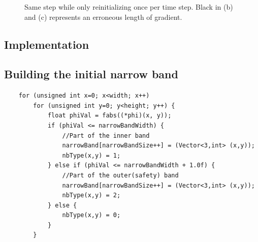 \begin{figure}[h]
  \centering
  \caption{Same step while only reinitializing once per time step. Black in (b) and (c) represents an erroneous length of gradient.}
  \label{fig:narrowBand}
\end{figure}




\subsection{Implementation}


\subsection{Building the initial narrow band}
\begin{lstlisting}
    for (unsigned int x=0; x<width; x++)
        for (unsigned int y=0; y<height; y++) {
            float phiVal = fabs((*phi)(x, y));
            if (phiVal <= narrowBandWidth) {
                //Part of the inner band
                narrowBand[narrowBandSize++] = (Vector<3,int> (x,y));
                nbType(x,y) = 1;
            } else if (phiVal <= narrowBandWidth + 1.0f) {
                //Part of the outer(safety) band
                narrowBand[narrowBandSize++] = (Vector<3,int> (x,y));
                nbType(x,y) = 2;
            } else {
                nbType(x,y) = 0;
            }
        }
\end{lstlisting}


